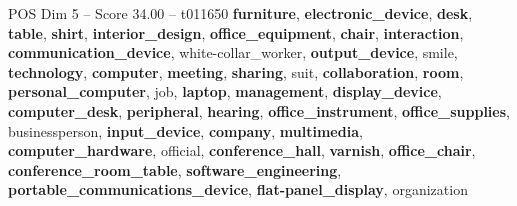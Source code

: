 \begin{textsample}{POS Dim 5 – Score 34.00 – t011650}  \label{ex:f5_pos_009}
\textbf{furniture}, \textbf{electronic\_device}, \textbf{desk}, \textbf{table}, \textbf{shirt}, \textbf{interior\_design}, \textbf{office\_equipment}, \textbf{chair}, \textbf{interaction}, \textbf{communication\_device}, white-collar\_worker, \textbf{output\_device}, smile, \textbf{technology}, \textbf{computer}, \textbf{meeting}, \textbf{sharing}, suit, \textbf{collaboration}, \textbf{room}, \textbf{personal\_computer}, job, \textbf{laptop}, \textbf{management}, \textbf{display\_device}, \textbf{computer\_desk}, \textbf{peripheral}, \textbf{hearing}, \textbf{office\_instrument}, \textbf{office\_supplies}, businessperson, \textbf{input\_device}, \textbf{company}, \textbf{multimedia}, \textbf{computer\_hardware}, official, \textbf{conference\_hall}, \textbf{varnish}, \textbf{office\_chair}, \textbf{conference\_room\_table}, \textbf{software\_engineering}, \textbf{portable\_communications\_device}, \textbf{flat-panel\_display}, organization

\end{textsample}

